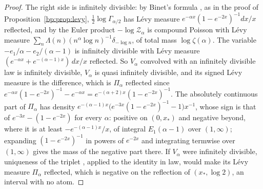 \begin{proof}
The right side is infinitely divisible: by Binet's formula \cite[\S5.9]{DLMF}, as in the proof of Proposition~\ref{bp:prop:levy}, $\frac12\log\Gamma_{\alpha/2}$ has L\'evy measure $e^{-\alpha x}(1-e^{-2x})^{-1}dx/x$ reflected, and by the Euler product $-\log\mathcal Z_\alpha$ is compound Poisson with L\'evy measure $\sum_n\Lambda(n)(n^\alpha\log n)^{-1}\delta_{-\log n}$, of total mass $\log\zeta(\alpha)$. The variable $-e_1/\alpha-e_2/(\alpha-1)$ is infinitely divisible with L\'evy measure $(e^{-\alpha x}+e^{-(\alpha-1)x})\,dx/x$ reflected. So $V_\alpha$ convolved with an infinitely divisible law is infinitely divisible, $V_\alpha$ is quasi infinitely divisible, and its signed L\'evy measure is the difference, which is $\Pi_\alpha$ reflected since $e^{-\alpha x}(1-e^{-2x})^{-1}-e^{-\alpha x}=e^{-(\alpha+2)x}(1-e^{-2x})^{-1}$. The absolutely continuous part of $\Pi_\alpha$ has density $e^{-(\alpha-1)x}\big(e^{-3x}(1-e^{-2x})^{-1}-1\big)x^{-1}$, whose sign is that of $e^{-3x}-(1-e^{-2x})$ for every $\alpha$: positive on $(0,x_*)$ and negative beyond, where it is at least $-e^{-(\alpha-1)x}/x$, of integral $E_1(\alpha-1)$ over $(1,\infty)$; expanding $(1-e^{-2x})^{-1}$ in powers of $e^{-2x}$ and integrating termwise over $(1,\infty)$ gives the mass of the negative part there. If $V_\alpha$ were infinitely divisible, uniqueness of the triplet \cite[Theorem 8.1]{Sato99}, applied to the identity in law, would make its L\'evy measure $\Pi_\alpha$ reflected, which is negative on the reflection of $(x_*,\log2)$, an interval with no atom.


\end{proof}
